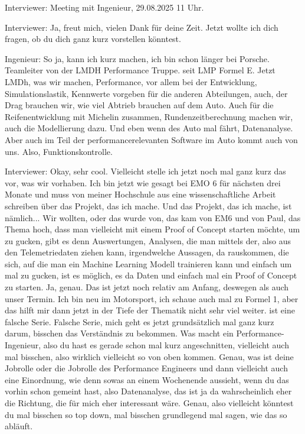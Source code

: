 \label{transkript-meeting1}


Interviewer: 
Meeting mit Ingenieur, 29.08.2025 11 Uhr. 


Interviewer: 
Ja, freut mich, vielen Dank für deine Zeit.  
Jetzt wollte ich dich fragen, ob du dich ganz kurz vorstellen könntest.  

Ingenieur: 
So ja, kann ich kurz machen, ich bin schon länger bei Porsche.   Teamleiter  von der LMDH Performance Truppe.   seit LMP Formel E. Jetzt LMDh, was wir machen, Performance, vor  allem bei der Entwicklung, Simulationslastik, Kennwerte vorgeben für die anderen Abteilungen, auch, der Drag brauchen wir, wie viel Abtrieb brauchen auf dem Auto.    Auch für die Reifenentwicklung mit Michelin zusammen, Rundenzeitberechnung machen wir, auch die Modellierung dazu. Und eben wenn des Auto mal fährt, Datenanalyse. Aber auch im Teil der performancerelevanten Software im Auto kommt auch von uns. Also, Funktionskontrolle. 

Interviewer: 
Okay, sehr cool. Vielleicht stelle ich jetzt noch mal ganz kurz das vor, was wir vorhaben. Ich bin jetzt wie gesagt bei EMO 6 für nächsten drei Monate und muss von meiner Hochschule aus eine wissenschaftliche Arbeit schreiben über das Projekt, das ich mache. Und das Projekt, das ich mache, ist nämlich...  Wir wollten, oder das wurde von, das kam von EM6 und von Paul, das Thema hoch, dass man vielleicht mit einem Proof of Concept starten möchte, um zu gucken, gibt es denn Auswertungen, Analysen, die man mittels der, also aus den Telemetriedaten ziehen kann, irgendwelche Aussagen, da rauskommen, die sich, auf die man ein Machine Learning Modell trainieren kann und einfach um mal zu gucken, ist es möglich, es da  Daten und einfach mal ein Proof of Concept zu starten.  Ja, genau. Das ist jetzt noch relativ am Anfang, deswegen als auch unser Termin. Ich bin neu im Motorsport, ich  schaue auch mal zu Formel 1, aber das hilft mir dann jetzt in der Tiefe der Thematik nicht sehr viel weiter. ist eine falsche Serie. Falsche Serie, mich geht es jetzt grundsätzlich mal ganz kurz darum, bisschen das Verständnis zu bekommen. Was  macht ein Performance-Ingenieur, also du hast es gerade schon mal kurz angeschnitten, vielleicht auch mal bisschen, also wirklich vielleicht so von oben kommen.  Genau,  was ist deine Jobrolle oder die Jobrolle des Performance Engineers und dann vielleicht auch eine Einordnung, wie denn sowas an einem Wochenende aussieht, wenn du das vorhin schon gemeint hast, also Datenanalyse, das ist ja da wahrscheinlich eher die Richtung, die für mich eher interessant wäre. Genau, also vielleicht könntest du mal bisschen so top down, mal bisschen grundlegend mal sagen, wie das so abläuft.  


